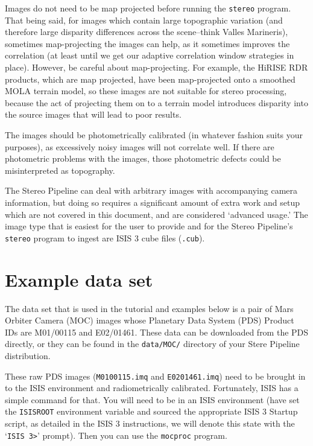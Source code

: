 Images do not need to be map projected before running the \texttt{stereo}
program. That being said, for images which contain large topographic
variation (and therefore large disparity differences across the
scene--think Valles Marineris), sometimes map-projecting the images
can help, as it sometimes improves the correlation (at least until
we get our adaptive correlation window strategies in place).  However,
be careful about map-projecting.  For example, the HiRISE RDR
products, which are map projected, have been map-projected onto a
smoothed MOLA terrain model, so these images are not suitable for
stereo processing, because the act of projecting them on to a terrain
model introduces disparity into the source images that will lead
to poor results.

The images should be photometrically calibrated (in whatever fashion
suits your purposes), as excessively noisy images will not correlate
well.  If there are photometric problems with the images, those
photometric defects could be misinterpreted as topography.

The Stereo Pipeline can deal with arbitrary images with accompanying
camera information, but doing so requires a significant amount of
extra work and setup which are not covered in this document, and
are considered `advanced usage.'  The image type that is easiest
for the user to provide and for the Stereo Pipeline's \texttt{stereo}
program to ingest are ISIS 3 cube files (\texttt{.cub}).


\section{Example data set}

The data set that is used in the tutorial and examples below is a
pair of Mars Orbiter Camera (MOC)
\citep{1992JGR....97.7699M,2001JGR...10623429M} images whose Planetary
Data System (PDS) Product IDs are M01/00115 and E02/01461.
These data can be downloaded from the PDS directly, or they can be found in 
the \texttt{data/MOC/} directory of your Stere Pipeline distribution.

These raw PDS images (\texttt{M0100115.imq} and \texttt{E0201461.imq})
need to be brought in to the ISIS environment and radiometrically
calibrated.  Fortunately, ISIS has a simple command for that.  You
will need to be in an ISIS environment (have set the \texttt{ISISROOT}
environment variable and sourced the appropriate ISIS 3 Startup
script, as detailed in the ISIS 3 instructions, we will denote this
state with the `\texttt{ISIS 3>}' prompt).  Then you can use the
\texttt{mocproc} program.

